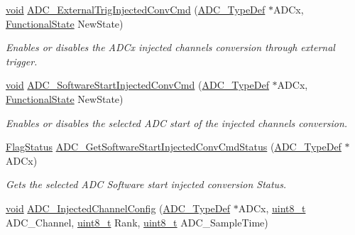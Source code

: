\begin{DoxyCompactItemize}
\hyperlink{usb__devapi_8h_afabf60e7f57651d6d595a02c75f07cd0}{void} \hyperlink{group___a_d_c___exported___functions_gad81d134c083d8f407c819e6f4722d553}{A\+D\+C\+\_\+\+External\+Trig\+Injected\+Conv\+Cmd} (\hyperlink{struct_a_d_c___type_def}{A\+D\+C\+\_\+\+Type\+Def} $\ast$A\+D\+Cx, \hyperlink{agilefox_2library_2inc_2stm32f10x__type_8h_ac9a7e9a35d2513ec15c3b537aaa4fba1}{Functional\+State} New\+State)
\begin{DoxyCompactList}\small\item\em Enables or disables the A\+D\+Cx injected channels conversion through external trigger. \end{DoxyCompactList}\item 
\hyperlink{usb__devapi_8h_afabf60e7f57651d6d595a02c75f07cd0}{void} \hyperlink{group___a_d_c___exported___functions_ga5b141d5dbf5f417a11dfa622c8c149d3}{A\+D\+C\+\_\+\+Software\+Start\+Injected\+Conv\+Cmd} (\hyperlink{struct_a_d_c___type_def}{A\+D\+C\+\_\+\+Type\+Def} $\ast$A\+D\+Cx, \hyperlink{agilefox_2library_2inc_2stm32f10x__type_8h_ac9a7e9a35d2513ec15c3b537aaa4fba1}{Functional\+State} New\+State)
\begin{DoxyCompactList}\small\item\em Enables or disables the selected A\+DC start of the injected channels conversion. \end{DoxyCompactList}\item 
\hyperlink{agilefox_2library_2inc_2stm32f10x__type_8h_a89136caac2e14c55151f527ac02daaff}{Flag\+Status} \hyperlink{group___a_d_c___exported___functions_ga8765f8835b8cfed13dce3d8d71767dcc}{A\+D\+C\+\_\+\+Get\+Software\+Start\+Injected\+Conv\+Cmd\+Status} (\hyperlink{struct_a_d_c___type_def}{A\+D\+C\+\_\+\+Type\+Def} $\ast$A\+D\+Cx)
\begin{DoxyCompactList}\small\item\em Gets the selected A\+DC Software start injected conversion Status. \end{DoxyCompactList}\item 
\hyperlink{usb__devapi_8h_afabf60e7f57651d6d595a02c75f07cd0}{void} \hyperlink{group___a_d_c___exported___functions_gae2b44bff080184e1cf6f2cb6b9bb3e59}{A\+D\+C\+\_\+\+Injected\+Channel\+Config} (\hyperlink{struct_a_d_c___type_def}{A\+D\+C\+\_\+\+Type\+Def} $\ast$A\+D\+Cx, \hyperlink{_p_e___types_8h_aba7bc1797add20fe3efdf37ced1182c5}{uint8\+\_\+t} A\+D\+C\+\_\+\+Channel, \hyperlink{_p_e___types_8h_aba7bc1797add20fe3efdf37ced1182c5}{uint8\+\_\+t} Rank, \hyperlink{_p_e___types_8h_aba7bc1797add20fe3efdf37ced1182c5}{uint8\+\_\+t} A\+D\+C\+\_\+\+Sample\+Time)

\end{DoxyCompactItemize}
